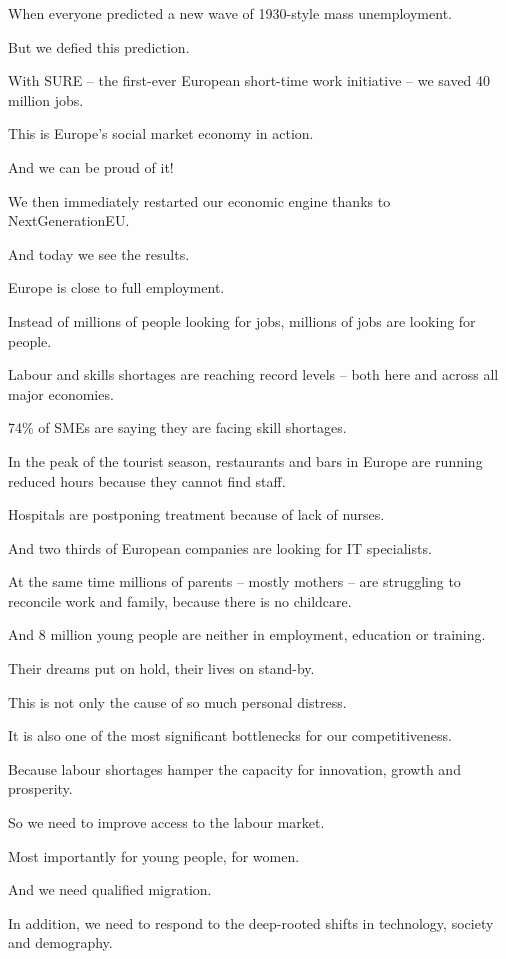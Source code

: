 \documentclass[a4paper,11pt]{article}
\begin{document}
When everyone predicted a new wave of 1930-style mass unemployment.

But we defied this prediction.

With SURE – the first-ever European short-time work initiative – we saved 40 million jobs.

This is Europe's social market economy in action. 

And we can be proud of it!

We then immediately restarted our economic engine thanks to NextGenerationEU.

And today we see the results.

Europe is close to full employment.

Instead of millions of people looking for jobs, millions of jobs are looking for people.

Labour and skills shortages are reaching record levels – both here and across all major economies.

74\% of SMEs are saying they are facing skill shortages.

In the peak of the tourist season, restaurants and bars in Europe are running reduced hours because they cannot find staff.

Hospitals are postponing treatment because of lack of nurses.

And two thirds of European companies are looking for IT specialists.

At the same time millions of parents – mostly mothers – are struggling to reconcile work and family, because there is no childcare.

And 8 million young people are neither in employment, education or training.

Their dreams put on hold, their lives on stand-by.

This is not only the cause of so much personal distress. 

It is also one of the most significant bottlenecks for our competitiveness. 

Because labour shortages hamper the capacity for innovation, growth and prosperity.

So we need to improve access to the labour market.

Most importantly for young people, for women.

And we need qualified migration.

In addition, we need to respond to the deep-rooted shifts in technology, society and demography.
\end{document}

